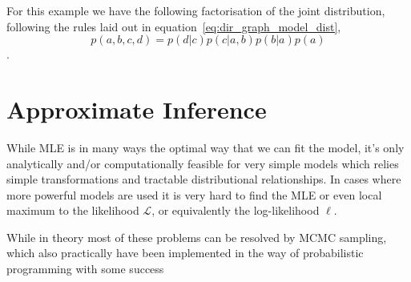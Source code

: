 For this example we have the following factorisation of the joint distribution,
following the rules laid out in equation~\ref{eq:dir_graph_model_dist},
\begin{equation*}
  p(a, b, c, d) = p(d | c)p(c | a, b)p(b | a)p(a)
\end{equation*}.

\section{Approximate Inference}

While MLE is in many ways the optimal way that we can fit the model, it's only
analytically and/or computationally feasible for very simple models which relies
simple transformations and tractable distributional relationships. In cases
where more powerful models are used it is very hard to find the MLE or even
local maximum to the likelihood $\mathcal{L}$, or equivalently the log-likelihood
$\ell$.

While in theory most of these problems can be resolved by MCMC
sampling, which also practically have been implemented in the way of
probabilistic programming with some
success\cite[Ch.~1]{brooks2011handbook}\cite{Carpenter_stan:a, }



